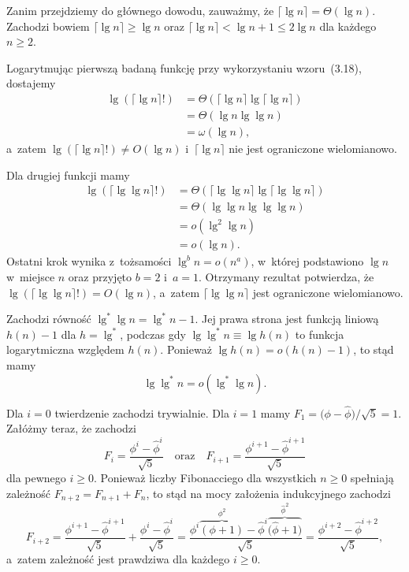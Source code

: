 Zanim przejdziemy do głównego dowodu, zauważmy, że $\lceil\lg n\rceil=\Theta(\lg n)$. Zachodzi bowiem $\lceil\lg n\rceil\ge\lg n$ oraz $\lceil\lg n\rceil<\lg n+1\le2\lg n$ dla każdego $n\ge2$.

Logarytmując pierwszą badaną funkcję przy wykorzystaniu wzoru~(3.18), dostajemy
\begin{align*}
	\lg(\lceil\lg n\rceil!) &= \Theta(\lceil\lg n\rceil\lg\lceil\lg n\rceil) \\
	&= \Theta(\lg n\lg\lg n) \\
	&= \omega(\lg n),
\end{align*}
a~zatem $\lg(\lceil\lg n\rceil!)\ne O(\lg n)$ i~$\lceil\lg n\rceil$ nie jest ograniczone wielomianowo.

Dla drugiej funkcji mamy
\begin{align*}
	\lg(\lceil\lg\lg n\rceil!) &= \Theta(\lceil\lg\lg n\rceil\lg\lceil\lg\lg n\rceil) \\
	&= \Theta(\lg\lg n\lg\lg\lg n) \\
	&= o(\lg^2\lg n) \\
	&= o(\lg n).
\end{align*}
Ostatni krok wynika z~tożsamości $\lg^bn=o(n^a)$, w~której podstawiono $\lg n$ w~miejsce $n$ oraz przyjęto $b=2$ i~$a=1$. Otrzymany rezultat potwierdza, że $\lg(\lceil\lg\lg n\rceil!)=O(\lg n)$, a~zatem $\lceil\lg\lg n\rceil$ jest ograniczone wielomianowo.

\exercise{} %
Zachodzi równość $\lg^*\lg n=\lg^*n-1$. Jej prawa strona jest funkcją liniową $h(n)-1$ dla $h=\lg^*$, podczas gdy $\lg\lg^*n\equiv\lg h(n)$ to funkcja logarytmiczna względem $h(n)$. Ponieważ $\lg h(n)=o(h(n)-1)$, to stąd mamy
\[
	\lg\lg^*n = o(\lg^*\lg n).
\]

\exercise{} %
Dla $i=0$ twierdzenie zachodzi trywialnie. Dla $i=1$ mamy $F_1=\bigl(\phi-\widehat\phi\bigr)/\sqrt{5}=1$. Załóżmy teraz, że zachodzi
\[
	F_i = \frac{\phi^i-\widehat\phi^i}{\sqrt{5}} \quad\text{oraz}\quad F_{i+1} = \frac{\phi^{i+1}-\widehat\phi^{i+1}}{\sqrt{5}}
\]
dla pewnego $i\ge0$. Ponieważ liczby Fibonacciego dla wszystkich $n\ge0$ spełniają zależność $F_{n+2}=F_{n+1}+F_n$, to stąd na mocy założenia indukcyjnego zachodzi
\[
	F_{i+2} = \frac{\phi^{i+1}-\widehat\phi^{i+1}}{\sqrt{5}}+\frac{\phi^i-\widehat\phi^i}{\sqrt{5}} = \frac{\phi^i\overbrace{(\phi+1)}^{\phi^2}-\widehat\phi^i\overbrace{\bigl(\widehat\phi+1\bigr)}^{\widehat\phi^2}}{\sqrt{5}} = \frac{\phi^{i+2}-\widehat\phi^{i+2}}{\sqrt{5}},
\]
a~zatem zależność jest prawdziwa dla każdego $i\ge0$.

